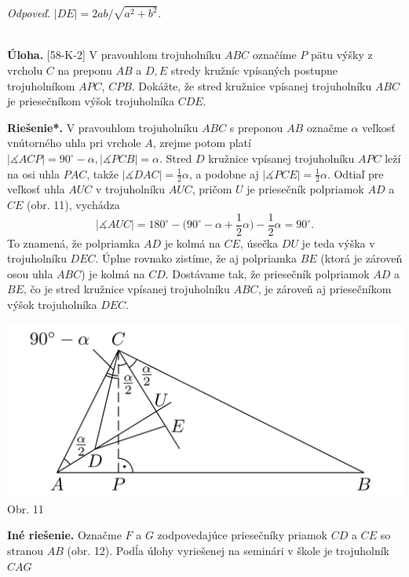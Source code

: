\documentclass[11pt,a4paper,oneside,final]{book}
\newcommand{\ul}{\textbf{Úloha.} }
\newcommand{\rieh}{\textbf{Riešenie*.} }
\newcommand{\ma}{\measuredangle}
\begin{document}
\textit{Odpoveď.} $|DE| = 2ab/\sqrt{a^2 + b^2}$.\\
\\
\begin{tcolorbox}[breakable,notitle,boxrule=0pt,colback=light-gray,colframe=light-gray]\ul [58-K-2]
V pravouhlom trojuholníku $ABC$ označíme $P$ pätu výšky z vrcholu $C$ na preponu $AB$ a $D, E$ stredy kružníc vpísaných postupne trojuholníkom $APC$, $CPB$. Dokážte, že stred
kružnice vpísanej trojuholníku $ABC$ je priesečníkom výšok trojuholníka $CDE$.

\end{tcolorbox}

\rieh V pravouhlom trojuholníku $ABC$ s preponou $AB$ označme $\alpha$ veľkosť vnútorného uhla pri vrchole $A$, zrejme potom platí $|\ma ACP| = 90^\circ -\alpha, |\ma PCB| = \alpha.$ Stred $D$ kružnice vpísanej trojuholníku $APC$ leží na osi uhla $PAC$, takže $|\ma DAC| = \frac{1}{2}\alpha$, a podobne aj $|\ma PCE| = \frac{1}{2}\alpha$. Odtiaľ pre veľkosť uhla $AUC$ v trojuholníku $AUC$, pričom $U$ je priesečník polpriamok $AD$ a $CE$ (obr. 11), vychádza
$$|\ma AUC| = 180^\circ -\bigg(90^\circ -\alpha + \frac{1}{2}\alpha\bigg) -\frac{1}{2}\alpha = 90^\circ.$$
To znamená, že polpriamka $AD$ je kolmá na $CE$, úsečka $DU$ je teda výška v trojuholníku $DEC$. Úplne rovnako zistíme, že aj polpriamka $BE$ (ktorá je zároveň osou uhla $ABC$) je kolmá na $CD$. Dostávame tak, že priesečník polpriamok $AD$ a $BE$, čo je stred kružnice vpísanej trojuholníku $ABC$, je zároveň aj priesečníkom výšok trojuholníka $DEC$.
\begin{center}
\includegraphics{58K21}\\

Obr. 11
\end{center}
\textbf{Iné riešenie.} Označme $F$ a $G$ zodpovedajúce priesečníky priamok $CD$ a $CE$ so stranou $AB$ (obr. 12). Podĺa úlohy vyriešenej na seminári v škole je trojuholník $CAG$
\end{document}

